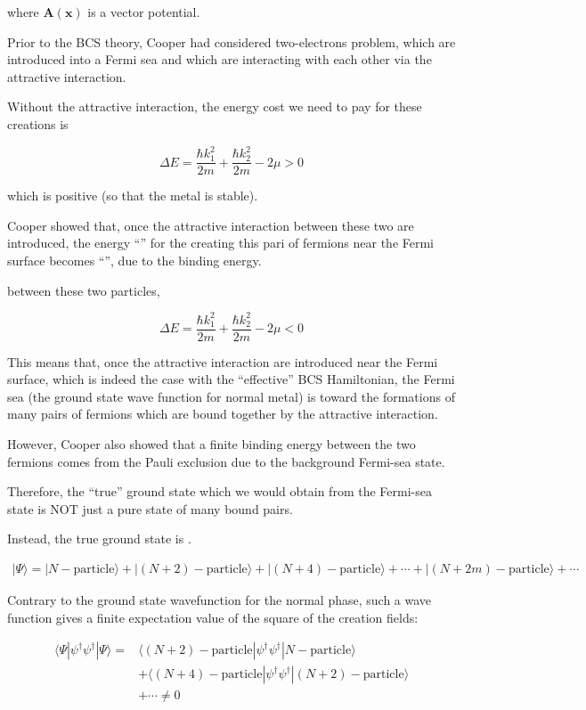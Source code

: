 where $\bm{A}(\bm{x})$ is a vector potential. 

Prior to the BCS theory, Cooper had considered two-electrons problem, which are introduced into a Fermi sea and which are interacting with each other via the attractive interaction. 

Without the attractive interaction, the energy cost we need to pay for these creations is 

\[\Delta E = \frac{\hbar k_1^2}{2m} + \frac{\hbar k_2^2}{2m}-2\mu > 0 \]

which is positive (so that the metal is stable). 

Cooper showed that, once the {} attractive interaction between these two are introduced, the energy ``'' for the creating this pari of fermions near the Fermi surface becomes ``'', due to the binding energy. 

between these two particles, 

\[\Delta E = \frac{\hbar k_1^2}{2m} + \frac{\hbar k_2^2}{2m}-2\mu < 0 \]

This means that, once the attractive interaction are introduced near the Fermi surface, which is indeed the case with the ``effective'' BCS Hamiltonian, the Fermi sea (the ground state wave function for normal metal) is  toward the formations of many pairs of fermions which are bound together by the attractive interaction. 

However, Cooper also showed that a finite binding energy between the two fermions comes from the Pauli exclusion due to the background Fermi-sea state. 

Therefore, the ``true'' ground state which we would obtain from the Fermi-sea state is NOT just a pure state of many bound pairs. 

Instead, the true ground state is . 

\begin{align}\tag{A} \label{eqA}
|\Psi\rangle = |N-\text{particle}\rangle + |(N+2)-\text{particle}\rangle + |(N+4)-\text{particle}\rangle + \cdots + |(N+2m)-\text{particle}\rangle + \cdots \end{align}

Contrary to the ground state wavefunction for the normal phase, such a wave function gives a finite expectation value of the square of the creation fields: 

\[\begin{split}
\langle \Psi|\psi^{\dagger}\psi^{\dagger}|\Psi\rangle =& \langle (N+2)-\text{particle}|\psi^{\dagger}\psi^{\dagger}|N-\text{particle}\rangle \\ &+ \langle(N+4)-\text{particle}|\psi^{\dagger}\psi^{\dagger}|(N+2)-\text{particle}\rangle\\ & + \cdots \neq 0 \end{split}\]

